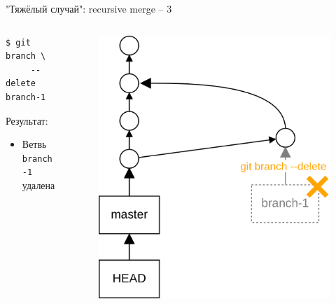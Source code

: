 \documentclass[presentation]{beamer}
\begin{document}
\begin{frame}[fragile]{"Тяжёлый случай": recursive merge -- 3}
  \begin{columns}
    \begin{column}{.4\textwidth}
\begin{verbatim}
$ git branch \
     --delete branch-1
\end{verbatim}
      Результат:
      \begin{itemize}
      \item Ветвь \texttt{branch-1} удалена
      \end{itemize}
      \end{column}
      \begin{column}{.6\textwidth}
        \begin{figure}[htb]
          \centering
          \includegraphics[height=.7\textheight]{git-operation-merge-2-3}
        \end{figure}
      \end{column}
    \end{columns}
\end{frame}
\end{document}

